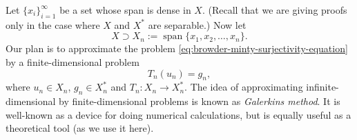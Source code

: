 \begin{Proof}
Let $\{x_i\}_{i=1}^\infty$ be a set whose span is dense in $X$. (Recall that we are giving proofs only in the case where $X$ and $X^*$ are separable.) Now let
\begin{equation}\label{eq:browder-minty-dense-finite-dimensional-spaces}
X\supset X_n:=\operatorname{span}\{x_1,x_2,\ldots,x_n\}.
\end{equation}
Our plan is to approximate the problem \eqref{eq:browder-minty-surjectivity-equation} by a finite-dimensional problem
\begin{equation}\label{eq:browder-minty-galerkin-finite-dimensional-problem}
T_n(u_n)=g_n,
\end{equation}
where $u_n\in X_n$, $g_n\in X_n^*$ and $T_n:X_n\to X_n^*$. The idea of approximating infinite-dimensional by finite-dimensional problems is known as \emph{Galerkin\textquotesingle s method}. It is well-known as a device for doing numerical calculations, but is equally useful as a theoretical tool (as we use it here).


\end{Proof}
